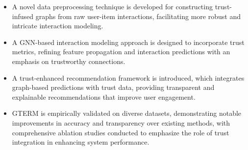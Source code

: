 \begin{itemize}
    \item A novel data preprocessing technique is developed for constructing trust-infused graphs from raw user-item interactions, facilitating more robust and intricate interaction modeling.
    \item A GNN-based interaction modeling approach is designed to incorporate trust metrics, refining feature propagation and interaction predictions with an emphasis on trustworthy connections.
    \item A trust-enhanced recommendation framework is introduced, which integrates graph-based predictions with trust data, providing transparent and explainable recommendations that improve user engagement.
    \item GTERM is empirically validated on diverse datasets, demonstrating notable improvements in accuracy and transparency over existing methods, with comprehensive ablation studies conducted to emphasize the role of trust integration in enhancing system performance.
\end{itemize}
